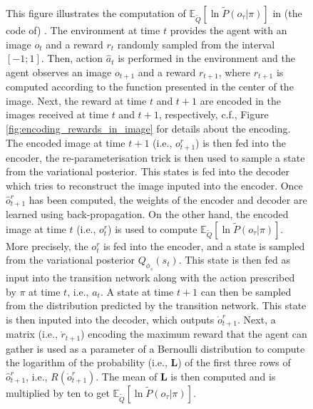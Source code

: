 \documentclass[twoside,11pt]{article}
\let\oldmathcal\mathcal
\renewcommand{\mathcal}[1]{%
  \IfSubStr{ABCDEFGHIJKLMNOPQRSTUVWXYZ}{#1}{\oldmathcal{#1}}{\mathdutchcal{#1}}
}
\begin{document}
\begin{figure}
\begin{center}
	\end{center}
  \caption{This figure illustrates the computation of $\mathbb{E}_{\tilde{Q}}[\ln \tilde{P}(o_\tau|\pi)]$ in (the code of) \citet{DeepAIwithMCMC}. The environment at time $t$ provides the agent with an image $o_t$ and a reward $r_t$ randomly sampled from the interval $[-1;1]$. Then, action $\hat{a}_t$ is performed in the environment and the agent observes an image $o_{t+1}$ and a reward $r_{t+1}$, where $r_{t+1}$ is computed according to the function presented in the center of the image. Next, the reward at time $t$ and $t+1$ are encoded in the images received at time $t$ and $t+1$, respectively, c.f., Figure \ref{fig:encoding_rewards_in_image} for details about the encoding. The encoded image at time $t+1$ (i.e., $o^r_{t+1}$) is then fed into the encoder, the re-parameterisation trick is then used to sample a state from the variational posterior. This states is fed into the decoder which tries to reconstruct the image inputed into the encoder. Once $\hat{o}^r_{t+1}$ has been computed, the weights of the encoder and decoder are learned using back-propagation. On the other hand, the encoded image at time $t$ (i.e., $o^r_t$) is used to compute $\mathbb{E}_{\tilde{Q}}[\ln \tilde{P}(o_\tau|\pi)]$. More precisely, the $o^r_t$ is fed into the encoder, and a state is sampled from the variational posterior $Q_{\phi_s}(s_t)$. This state is then fed as input into the transition network along with the action prescribed by $\pi$ at time $t$, i.e., $a_t$. A state at time $t+1$ can then be sampled from the distribution predicted by the transition network. This state is then inputed into the decoder, which outputs $\mathring{o}^r_{t+1}$. Next, a matrix (i.e., $\mathring{r}_{t+1}$) encoding the maximum reward that the agent can gather is used as a parameter of a Bernoulli distribution to compute the logarithm of the probability (i.e., $\bm{L}$) of the first three rows of $\hat{o}^r_{t+1}$, i.e., $R(\mathring{o}^r_{t+1})$. The mean of $\bm{L}$ is then computed and is multiplied by ten to get $\mathbb{E}_{\tilde{Q}}[\ln \tilde{P}(o_\tau|\pi)]$.}
   \label{fig:computation_of_extrinsic_value}
\end{figure}
\end{document}
